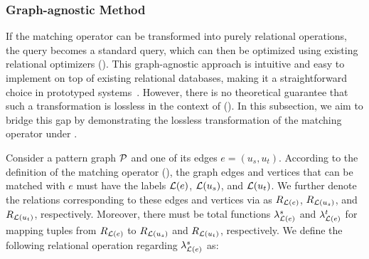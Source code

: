 
\subsubsection{Graph-agnostic Method}
\label{sec:intuitive-method}
If the matching operator can be transformed into purely relational operations, the \spjm query becomes a
standard \spj query, which can then be optimized using existing relational optimizers (). This graph-agnostic
approach is intuitive and easy to implement on top of existing relational databases, making it a straightforward
choice in prototyped systems~\cite{apache-age,DuckPGQ,DuckPGQ-VLDB}. However, there is no theoretical guarantee that
such a transformation is lossless in the context of \rgmapping (). In this subsection,
we aim to bridge this gap by demonstrating the lossless transformation of the matching
operator under \rgmapping.

Consider a pattern graph $\mathcal{P}$ and one of its edges $e = (u_s, u_t)$. According to the definition of the matching operator (), the graph edges and vertices that can be matched with $e$ must have the labels $\mathcal{L}(e)$, $\mathcal{L}(u_s)$, and $\mathcal{L}(u_t)$. We further denote the relations corresponding to these edges and vertices via \rgmapping as $R_{\mathcal{L}(e)}$, $R_{\mathcal{L}(u_s)}$, and $R_{\mathcal{L}(u_t)}$, respectively. Moreover, there must be total functions $\lambda_{\mathcal{L}(e)}^s$ and $\lambda_{\mathcal{L}(e)}^t$ for mapping tuples from $R_{\mathcal{L}(e)}$ to $R_{\mathcal{L}(u_s)}$ and $R_{\mathcal{L}(u_t)}$, respectively. We define the following \EVjoin relational operation regarding $\lambda_{\mathcal{L}(e)}^s$ as:

